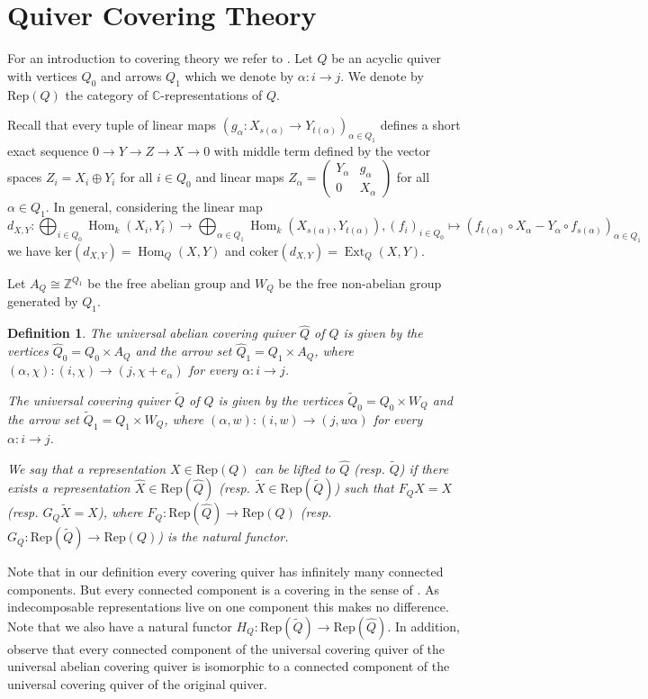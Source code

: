 \documentclass{amsart}
\newtheorem{definition}[theorem]{Definition}
\newcommand{\C}{\mathbb{C}}
\newcommand{\Rep}{\mathrm{Rep}}
\newcommand{\ZZ}{\mathbb{Z}}
\newcommand{\Ext}{\operatorname{Ext}}
\newcommand{\Hom}{\operatorname{Hom}}
\newcommand{\ses}[3]{0\rightarrow #1\rightarrow #2\rightarrow#3\rightarrow 0}
\begin{document}
\section{Quiver Covering Theory}

For an introduction to covering theory we refer to \cite{gab}.
Let $Q$ be an acyclic quiver with vertices $Q_0$ and arrows $Q_1$ which we denote by $\alpha:i\to j$.
We denote by $\Rep(Q)$ the category of $\C$-representations of $Q$.

Recall that every tuple of linear maps $(g_\alpha:X_{s(\alpha)}\to Y_{t(\alpha)})_{\alpha\in Q_1}$ defines a short exact sequence $\ses{Y}{Z}{X}$ with middle term defined by the vector spaces $Z_i=X_i\oplus Y_i$ for all $i\in Q_0$ and linear maps $Z_\alpha=\begin{pmatrix}Y_\alpha &g_\alpha\\0&X_\alpha\end{pmatrix}$ for all $\alpha\in Q_1$. 
In general, considering the linear map  
\[d_{X,Y}:\bigoplus_{i\in Q_0}\Hom_k(X_i,Y_i)\to\bigoplus_{\alpha\in Q_1}\Hom_k(X_{s(\alpha)},Y_{t(\alpha)}), (f_i)_{i\in Q_0}\mapsto(f_{t(\alpha)}\circ X_\alpha-Y_\alpha\circ f_{s(\alpha)})_{\alpha\in Q_1} \]
we have $\mathrm{ker}(d_{X,Y})=\Hom_Q(X,Y)$ and $\mathrm{coker}(d_{X,Y})=\Ext_Q(X,Y)$.

Let $A_Q\cong \ZZ^{Q_1}$ be the free abelian group and $W_{Q}$ be the free non-abelian group generated by $Q_1$.  
\begin{definition}
  The universal abelian covering quiver $\hat Q$ of $Q$ is given by the vertices $\hat Q_0=Q_0\times A_{Q}$ and the arrow set $\hat Q_1=Q_1\times A_{Q}$, where $(\alpha,\chi):(i,\chi)\to (j,\chi+e_\alpha)$ for every $\alpha:i\to j$.

  The universal covering quiver $\tilde Q$ of $Q$ is given by the vertices $\tilde Q_0=Q_0\times W_{Q}$ and the arrow set $\tilde Q_1=Q_1\times W_{Q}$, where $(\alpha,w):(i,w)\to (j,w\alpha)$ for every $\alpha:i\to j$.

  We say that a representation $X\in \Rep(Q)$ can be lifted to $\hat Q$ (resp. $\tilde Q$) if there exists a representation $\hat X\in\Rep(\hat Q)$ (resp. $\tilde X\in\Rep(\tilde Q)$) such that $F_Q\hat X=X$ (resp. $G_Q \tilde X=X$), where $F_Q:\Rep(\hat Q)\to\Rep(Q)$ (resp. $G_Q:\Rep(\tilde Q)\to\Rep(Q)$) is the natural functor.
\end{definition}

Note that in our definition every covering quiver has infinitely many connected components.
But every connected component is a covering in the sense of \cite{gab}.
As indecomposable representations live on one component this makes no difference.
Note that we also have a natural functor $H_Q:\Rep(\tilde Q)\to \Rep(\hat Q)$.
In addition, observe that every connected component of the universal covering quiver of the universal abelian covering quiver is isomorphic to a connected component of the universal covering quiver of the original quiver.
\end{document}
